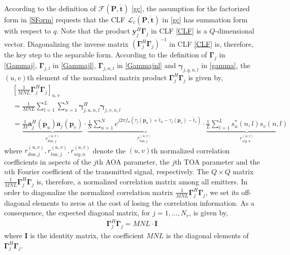 \documentclass[review]{elsarticle}
\begin{document}
According to the definition of $\mathcal{F}(\boldsymbol{P},\mathring{\boldsymbol{t}})$ \eqref{gc}, the assumption for the factorized form in \eqref{SForm} requests that the CLF $\mathcal{L}_c(\boldsymbol{P},\mathring{\boldsymbol{t}})$ in \eqref{gc} has summation form with respect to $q$. Note that the product $\boldsymbol{y}_j^H\boldsymbol{\Gamma}_{j}$ in CLF \eqref{CLF} is a $Q$-dimensional vector. Diagonalizing the inverse matrix $(\boldsymbol{\Gamma}_{j}^H\boldsymbol{\Gamma}_{j})^{-1}$ in CLF \eqref{CLF} is, therefore, the key step to the separable form. According to the definition of $\boldsymbol{\Gamma}_{j}$ in \eqref{Gammaj},  $\boldsymbol{\Gamma}_{j,l}$ in \eqref{Gammajl}, $\boldsymbol{\Gamma}_{j,n,l}$ in \eqref{Gammajnl} and $\boldsymbol{\gamma}_{j,q,n,l}$ in \eqref{gamma}, the $(u,v)$th element of the normalized matrix product $\boldsymbol{\Gamma}_{j}^H\boldsymbol{\Gamma}_{j}$ is given by,
\begin{align}\label{off-diagonal}
    &[\frac{1}{MNL}\boldsymbol{\Gamma}_{j}^H\boldsymbol{\Gamma}_{j}]_{u,v}\\
    &=\frac{1}{MNL}\sum_{l=1}^L\sum_{n=1}^N \boldsymbol{\gamma}_{j,u,n,l}^H\boldsymbol{\gamma}_{j,v,n,l}\\
    &=\underbrace{\frac{1}{M}\boldsymbol{a}_j^H(\boldsymbol{p}_u)\boldsymbol{a}_j(\boldsymbol{p}_v)}_{r_{doa,j}^{(u,v)}}\cdot\underbrace{\frac{1}{N}\sum_{n=1}^N e^{j2\pi f_n(\tau_j(\boldsymbol{p}_u)+\mathring{t}_u-\tau_j(\boldsymbol{p}_v)-\mathring{t}_v)}}_{r_{toa,j}^{(u,v)}}\cdot \underbrace{\frac{1}{L}\sum_{l=1}^L s_u^\ast(n,l)s_v(n,l)}_{r_{sig,n}^{(u,v)}}
\end{align}
where $r_{doa,j}^{(u,v)}, r_{toa,j}^{(u,v)}, r_{sig,n}^{(u,v)}$ denote the $(u,v)$th normalized correlation coefficients in aspects of the $j$th AOA parameter, the $j$th TOA parameter and the $n$th Fourier coefficient of the transmitted signal, respectively. The $Q\times Q$ matrix $\frac{1}{MNL}\boldsymbol{\Gamma}_{j}^H\boldsymbol{\Gamma}_{j}$ is, therefore, a normalized correlation matrix among all emitters. In order to diagonalize the normalized correlation matrix $\frac{1}{MNL}\boldsymbol{\Gamma}_{j}^H\boldsymbol{\Gamma}_{j}$, we set its off-diagonal elements to zeros at the cost of losing the correlation information. As a consequence, the expected diagonal matrix, for $j=1,...,N_r$, is given by,
\begin{align}\label{GammaDiag}
    \boldsymbol{\Gamma}_{j}^H\boldsymbol{\Gamma}_{j}=MNL\cdot \boldsymbol{I}
\end{align}
where $\boldsymbol{I}$ is the identity matrix, the coefficient $MNL$ is the diagonal elements of $\boldsymbol{\Gamma}_{j}^H\boldsymbol{\Gamma}_{j}$. 
\end{document}
